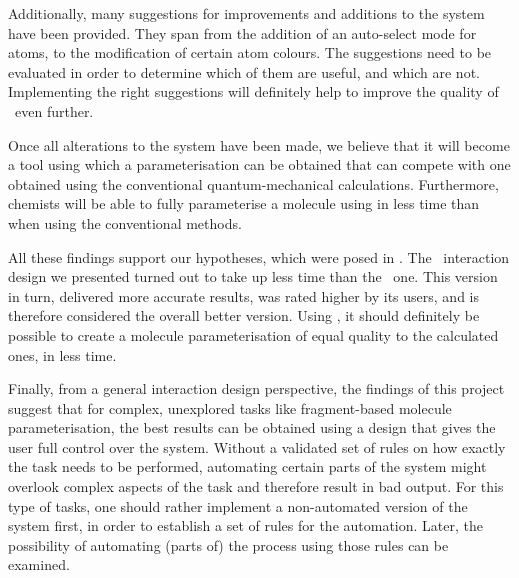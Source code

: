 Additionally, many suggestions for improvements and additions to the system have been provided. They span from the addition of an auto-select mode for atoms, to the modification of certain atom colours. The suggestions need to be evaluated in order to determine which of them are useful, and which are not. Implementing the right suggestions will definitely help to improve the quality of \oframp\ even further.

Once all alterations to the system have been made, we believe that it will become a tool using which a parameterisation can be obtained that can compete with one obtained using the conventional quantum-mechanical calculations. Furthermore, chemists will be able to fully parameterise a molecule using \oframp{} in less time than when using the conventional methods.

All these findings support our hypotheses, which were posed in . The \IDb\ interaction design we presented turned out to take up less time than the \IDa\ one. This version in turn, delivered more accurate results, was rated higher by its users, and is therefore considered the overall better version. Using \oframp, it should definitely be possible to create a molecule parameterisation of equal quality to the calculated ones, in less time.

Finally, from a general interaction design perspective, the findings of this project suggest that for complex, unexplored tasks like fragment-based molecule parameterisation, the best results can be obtained using a design that gives the user full control over the system. Without a validated set of rules on how exactly the task needs to be performed, automating certain parts of the system might overlook complex aspects of the task and therefore result in bad output. For this type of tasks, one should rather implement a non-automated version of the system first, in order to establish a set of rules for the automation. Later, the possibility of automating (parts of) the process using those rules can be examined.
